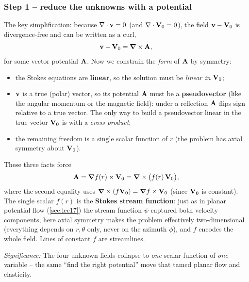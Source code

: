 \documentclass[../main.tex]{subfiles}
\begin{document}
\subsubsection*{Step 1 -- reduce the unknowns with a potential}
The key simplification: because $\nabla \cdot\mathbf{v}=0$ (and $\nabla \cdot\mathbf{V}_0=0$), the field $\mathbf{v}-\mathbf{V}_0$ is divergence-free and can be written as a curl,
\begin{equation}
  \mathbf{v}-\mathbf{V}_0=\grad\times\mathbf{A} ,
  \label{eq:lec21_vecpot}
\end{equation}
for some vector potential $\mathbf{A}$. Now we constrain the \emph{form} of $\mathbf{A}$ by symmetry:
\begin{itemize}
  \item the Stokes equations are \textbf{linear}, so the solution must be \emph{linear in} $\mathbf{V}_0$;
  \item $\mathbf{v}$ is a true (polar) vector, so its potential $\mathbf{A}$ must be a \textbf{pseudovector} (like the angular momentum or the magnetic field): under a reflection $\mathbf{A}$ flips sign relative to a true vector. The only way to build a pseudovector linear in the true vector $\mathbf{V}_0$ is with a \emph{cross product};
  \item the remaining freedom is a single scalar function of $r$ (the problem has axial symmetry about $\mathbf{V}_0$).
\end{itemize}
These three facts force
\begin{equation}
  \mathbf{A}=\grad f(r)\times\mathbf{V}_0=\grad\times\big(f(r)\,\mathbf{V}_0\big),
  \label{eq:lec21_A}
\end{equation}
where the second equality uses $\grad\times(f\mathbf{V}_0)=\grad f\times\mathbf{V}_0$ (since $\mathbf{V}_0$ is constant). The single scalar $f(r)$ is the \textbf{Stokes stream function}: just as in planar potential flow (\cref{sec:lec17}) the stream function $\psi$ captured both velocity components, here axial symmetry makes the problem effectively two-dimensional (everything depends on $r,\theta$ only, never on the azimuth $\phi$), and $f$ encodes the whole field. Lines of constant $f$ are streamlines.

\textit{Significance:} The four unknown fields collapse to \emph{one} scalar function of \emph{one} variable -- the same ``find the right potential'' move that tamed planar flow and elasticity.
\end{document}
